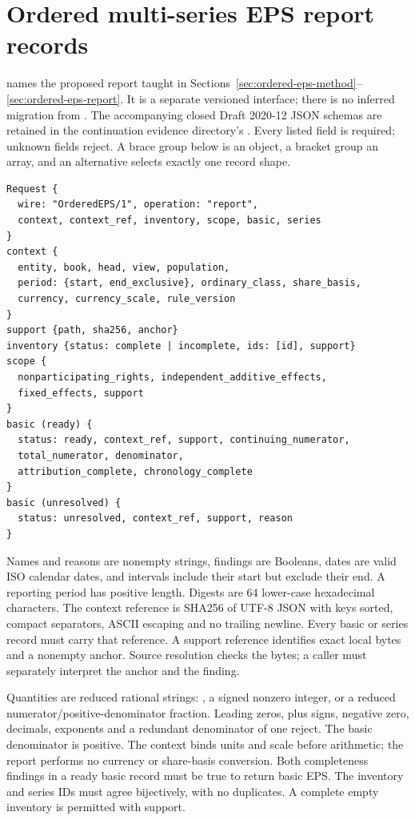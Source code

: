 \section{Ordered multi-series EPS report records}
\label{sec:ordered-eps-records}

 names the proposed report taught in
Sections~\ref{sec:ordered-eps-method}--\ref{sec:ordered-eps-report}.
It is a separate versioned interface; there is no inferred migration from
. The accompanying closed Draft 2020-12 JSON
schemas are retained in the continuation evidence directory's
. Every listed field is required;
unknown fields reject. A brace group below is an object, a bracket group
an array, and an alternative selects exactly one record shape.

\begin{lstlisting}
Request {
  wire: "OrderedEPS/1", operation: "report",
  context, context_ref, inventory, scope, basic, series
}
context {
  entity, book, head, view, population,
  period: {start, end_exclusive}, ordinary_class, share_basis,
  currency, currency_scale, rule_version
}
support {path, sha256, anchor}
inventory {status: complete | incomplete, ids: [id], support}
scope {
  nonparticipating_rights, independent_additive_effects,
  fixed_effects, support
}
basic (ready) {
  status: ready, context_ref, support, continuing_numerator,
  total_numerator, denominator,
  attribution_complete, chronology_complete
}
basic (unresolved) {
  status: unresolved, context_ref, support, reason
}
\end{lstlisting}

Names and reasons are nonempty strings, findings are Booleans, dates are
valid ISO calendar dates, and intervals include their start but exclude their
end. A reporting period has positive length. Digests are 64 lower-case
hexadecimal characters. The context reference is SHA256 of UTF-8 JSON with
keys sorted, compact separators, ASCII escaping and no trailing newline.
Every basic or series record must carry that reference. A support reference
identifies exact local bytes and a nonempty anchor. Source resolution checks
the bytes; a caller must separately interpret the anchor and the finding.

Quantities are reduced rational strings: , a signed nonzero integer,
or a reduced numerator/positive-denominator fraction. Leading zeros, plus
signs, negative zero, decimals, exponents and a redundant denominator of one
reject. The basic denominator is positive. The context binds units and scale
before arithmetic; the report performs no currency or share-basis conversion.
Both completeness findings in a ready basic record must be true to return
basic EPS. The inventory and series IDs must agree bijectively, with no
duplicates. A complete empty inventory is permitted with support.

